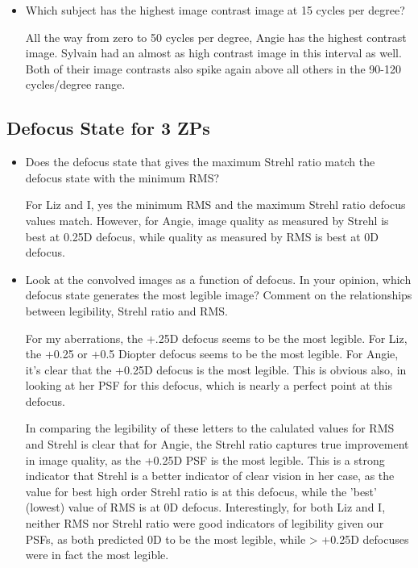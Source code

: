 \documentclass{article}
\begin{document}
\begin{itemize}
\item Which subject has the highest image contrast image at 15 cycles per degree?

All the way from zero to 50 cycles per degree, Angie has the highest contrast image. Sylvain had an almost as high contrast image in this interval as well. Both of their image contrasts also spike again above all others in the 90-120 cycles/degree range.

\end{itemize}

\subsection{Defocus State for 3 ZPs}

\begin{itemize}
\item Does the defocus state that gives the maximum Strehl ratio match the defocus state with the minimum RMS?

For Liz and I, yes the minimum RMS and the maximum Strehl ratio defocus values match. However, for Angie, image quality as measured by Strehl is best at 0.25D defocus, while quality as measured by RMS is best at 0D defocus. 

\item Look at the convolved images as a function of defocus. In your opinion, which defocus state generates the most legible image? Comment on the relationships between legibility, Strehl ratio and RMS.

For my aberrations, the +.25D  defocus seems to be the most legible. For Liz, the +0.25 or +0.5 Diopter defocus seems to be the most legible. For Angie, it's clear that the +0.25D defocus is the most legible. This is obvious also, in looking at her PSF for this defocus, which is nearly a perfect point at this defocus.

In comparing the legibility of these letters to the calulated values for RMS and Strehl is clear that for Angie, the Strehl ratio captures true improvement in image quality, as the +0.25D PSF is the most legible. This is a strong indicator that Strehl is a better indicator of clear vision in her case, as the value for best high order Strehl ratio is at this defocus, while the 'best' (lowest) value of RMS is at 0D defocus. Interestingly, for both Liz and I, neither RMS nor Strehl ratio were good indicators of legibility given our PSFs, as both predicted 0D to be the most legible, while > +0.25D defocuses were in fact the most legible. 


\end{itemize}
\end{document}

